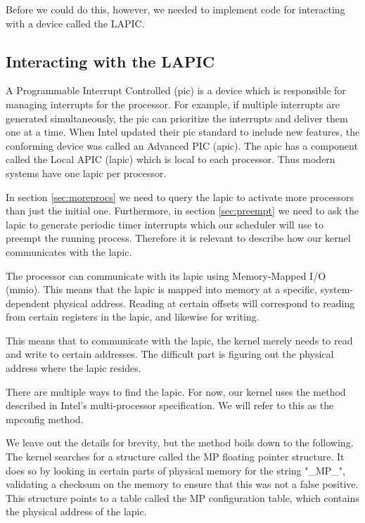 \documentclass{article}
\begin{document}
Before we could do this, however, we needed to implement code for interacting
with a device called the LAPIC.


\subsection{Interacting with the LAPIC}
A Programmable Interrupt Controlled (\gls{pic}) is a device which is
responsible for managing interrupts for the processor. For example, if
multiple interrupts are generated simultaneously, the \gls{pic} can prioritize
the interrupts and deliver them one at a time. When Intel updated their
\gls{pic} standard to include new features, the conforming device was called
an Advanced PIC (\gls{apic}). The \gls{apic} has a component called the Local
APIC (\gls{lapic}) which is local to each processor. Thus modern systems have
one \gls{lapic} per processor.

In section \ref{sec:moreprocs} we need to query the \gls{lapic} to activate
more processors than just the initial one. Furthermore, in section
\ref{sec:preempt} we need to ask the \gls{lapic} to generate periodic timer
interrupts which our scheduler will use to preempt the running process.
Therefore it is relevant to describe how our kernel communicates with the
\gls{lapic}.

The processor can communicate with its \gls{lapic} using Memory-Mapped I/O
(\gls{mmio}). This means that the \gls{lapic} is mapped into memory at a
specific, system-dependent physical address. Reading at certain offsets will
correspond to reading from certain registers in the \gls{lapic}, and likewise
for writing.

This means that to communicate with the \gls{lapic}, the kernel merely needs
to read and write to certain addresses. The difficult part is figuring out the
physical address where the \gls{lapic} resides.

There are multiple ways to find the \gls{lapic}. For now, our kernel uses the
method described in Intel's multi-processor specification. We will refer to
this as the \gls{mpconfig} method.

We leave out the details for brevity, but the method boils down to the
following. The kernel searches for a structure called the MP floating pointer
structure. It does so by looking in certain parts of physical memory for the
string "\_MP\_", validating a checksum on the memory to ensure that this was
not a false positive. This structure points to a table called the MP
configuration table, which contains the physical address of the \gls{lapic}. 
\end{document}
